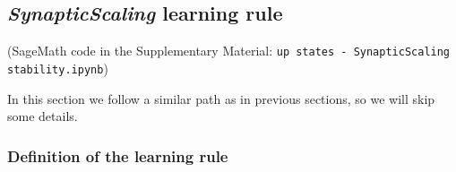 \documentclass[
twocolumn,
]{article}
\newcommand{\EI}{\mathit{EI}}
\newcommand{\IE}{\mathit{IE}}
\newcommand{\II}{\mathit{II}}
\begin{document}







\subsection{{\em SynapticScaling} learning rule}
\label{sec.SS_details}

(SageMath code in the Supplementary Material: {\tt up states - SynapticScaling stability.ipynb})

In this section we follow a similar path as in previous sections, so we will skip some details.


\subsubsection{Definition of the learning rule}
\end{document}
